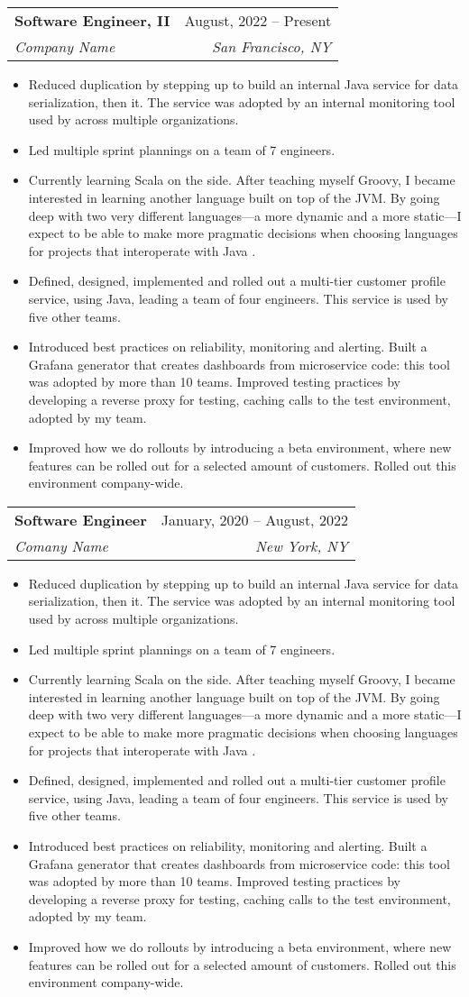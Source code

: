 \documentclass[letterpaper,11pt]{article}
\makeatletter
\newcommand{\resumeItem}[1]{
  \item\small{
    {#1 \vspace{-2pt}}
  }
}
\newcommand{\resumeSubheading}[4]{
  \vspace{-2pt}\item
    \begin{tabular*}{0.97\textwidth}[t]{l@{\extracolsep{\fill}}r}
      \textbf{#1} & #2 \\
      \textit{\small#3} & \textit{\small #4} \\
    \end{tabular*}\vspace{-7pt}
}
\newcommand{\resumeItemListStart}{\begin{itemize}}
\newcommand{\resumeItemListEnd}{\end{itemize}\vspace{-5pt}}
\makeatother
\begin{document}
    \resumeSubheading
      {Software Engineer, II}{ August, 2022 -- Present}
      {Company Name}{San Francisco, NY}
      \resumeItemListStart
      \resumeItem{ Reduced duplication by stepping up to build an internal Java service for data serialization, then it. The service was adopted by an internal monitoring tool used by across multiple organizations.}
      \resumeItem{ Led multiple sprint plannings on a team of 7 engineers.}
      \resumeItem{Currently learning Scala on the side. After teaching myself Groovy, I became interested in learning another language built on top of the JVM. By going deep with two very different languages—a more dynamic and a more static—I expect to be able to make more pragmatic decisions when choosing languages for projects that interoperate with Java .}
      \resumeItem{ Defined, designed, implemented and rolled out a multi-tier customer profile service, using Java, leading a team of four engineers. This service is used by five other teams.}
      \resumeItem{ Introduced best practices on reliability, monitoring and alerting. Built a Grafana generator that creates dashboards from microservice code: this tool was adopted by more than 10 teams. Improved testing practices by developing a reverse proxy for testing, caching calls to the test environment, adopted by my team.}
      \resumeItem{ Improved how we do rollouts by introducing a beta environment, where new features can be rolled out for a selected amount of customers. Rolled out this environment company-wide.}
      \resumeItemListEnd

    \resumeSubheading
      { Software Engineer }{January, 2020 -- August, 2022}
      {Comany Name}{New York, NY}
      \resumeItemListStart
      \resumeItem{ Reduced duplication by stepping up to build an internal Java service for data serialization, then it. The service was adopted by an internal monitoring tool used by across multiple organizations.}
      \resumeItem{ Led multiple sprint plannings on a team of 7 engineers.}
      \resumeItem{Currently learning Scala on the side. After teaching myself Groovy, I became interested in learning another language built on top of the JVM. By going deep with two very different languages—a more dynamic and a more static—I expect to be able to make more pragmatic decisions when choosing languages for projects that interoperate with Java .}
      \resumeItem{ Defined, designed, implemented and rolled out a multi-tier customer profile service, using Java, leading a team of four engineers. This service is used by five other teams.}
      \resumeItem{ Introduced best practices on reliability, monitoring and alerting. Built a Grafana generator that creates dashboards from microservice code: this tool was adopted by more than 10 teams. Improved testing practices by developing a reverse proxy for testing, caching calls to the test environment, adopted by my team.}
      \resumeItem{ Improved how we do rollouts by introducing a beta environment, where new features can be rolled out for a selected amount of customers. Rolled out this environment company-wide.}
    \resumeItemListEnd
\end{document}
